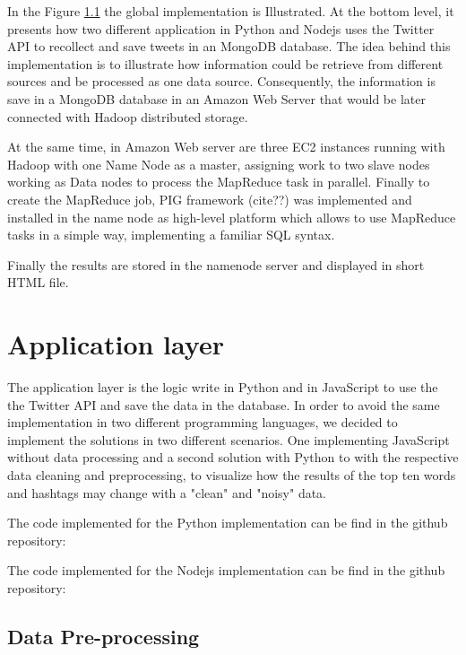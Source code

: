 \documentclass{article}
\begin{document}
        In the Figure \ref{} the global implementation is Illustrated. At the bottom level, it presents how two different application in Python and Nodejs uses the Twitter API to recollect and save tweets
        in an MongoDB database. The idea behind this implementation is to illustrate how information could be retrieve from different sources and be processed as one data source.
        Consequently, the information is save in a MongoDB database in an Amazon Web Server that would be later connected with Hadoop distributed storage.

        At the same time, in Amazon Web server are three EC2 instances running with Hadoop with one Name Node as a master, assigning work to two slave nodes working as Data nodes to process the MapReduce task in
        parallel. Finally to create the MapReduce job, PIG framework (cite??) was implemented and installed in the name node as high-level platform which allows to use MapReduce tasks in a simple way, implementing
        a familiar SQL syntax.

        Finally the results are stored in the namenode server and displayed in short HTML file.

        
        \section{Application layer}

        The application layer is the logic write in Python and in JavaScript to use the the Twitter API and save the data in the database. In order to avoid the same implementation in two different programming languages,
        we decided to implement the solutions in two different scenarios. One implementing JavaScript without data processing and a second solution with Python to with the respective data cleaning and preprocessing, to
        visualize how the results of the top ten words and hashtags may change with a "clean" and "noisy" data.

        The code implemented for the Python implementation can be find in the github repository: %

        The code implemented for the Nodejs implementation can be find in the github repository: %

        \subsection{Data Pre-processing}
\end{document}
